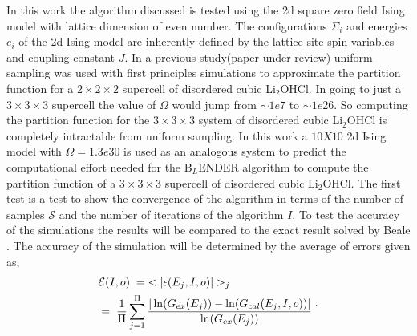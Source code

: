\documentclass[aps,prl,reprint,superscriptaddress,showkeys]{revtex4-1}
\begin{document}
In this work the algorithm discussed is tested using the 2d square zero field  Ising model with lattice dimension of even number\cite{exact_statistical,Onsager,Ising}.  The configurations $\Sigma_i$ and energies $e_i$ of the 2d Ising model are inherently defined by the lattice site spin variables and coupling constant $J$. In a previous study(paper under review) uniform sampling was used with first principles simulations to approximate the partition function for a $2\times 2\times 2$ supercell  of disordered cubic Li$_2$OHCl. In going to just a $3\times 3\times 3$ supercell the value of $\Omega$ would jump from $\sim1e7$ to  $\sim1e26$. So computing the partition function for the $3\times 3\times 3$ system of disordered cubic Li$_2$OHCl is completely intractable from uniform sampling. In this work a $10X10$ 2d Ising model with $\Omega = 1.3e30$ is used as an analogous system to predict the computational effort needed for the B$_L$ENDER algorithm to compute the partition function of a  $3\times 3\times 3$ supercell of disordered cubic Li$_2$OHCl.  The first test is a test to show the convergence of the algorithm in terms of the number of samples $\mathcal{S}$ and the number of iterations of the algorithm $I$. To test the accuracy of the simulations the results will be compared to the exact result solved by Beale \cite{Beale_2d_ising}. The accuracy of the simulation will be determined by the average of errors given as, 
\begin{equation}
\begin{split}
 &\mathcal{E}(I,o) \hspace{0.1cm}= \hspace{0.1cm}< |\epsilon(E_j,I,o)| >_j\\
& = \hspace{0.1cm}  \frac{1}{\Pi} \sum_{j=1}^{\Pi}\frac{|\ln(G_{ex}(E_j))- \ln(G_{cal}(E_j,I,o))|}{\ln(G_{ex}(E_j))}\; 
 \end{split}. 
\end{equation}
\end{document}

